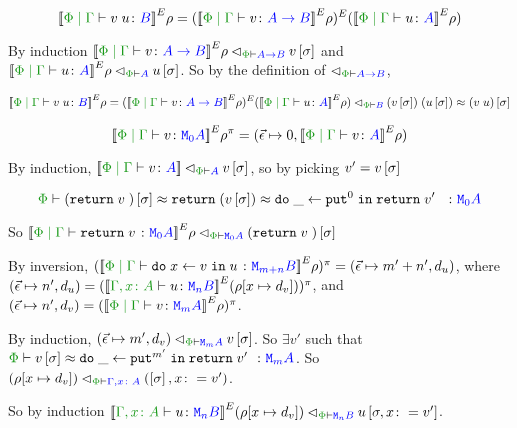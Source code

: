 \documentclass{Report}
\newcommand\eLogRel[4]{\logRel{#2}{\wellformed{#1}{#3}}{#4}}
\newcommand\peLogRel[3]{\eLogRel{\P}{#1}{#2}{#3}}
\newcommand{\zpberelation}[2]{\berelation{\P}{#1}{#2}}
\newcommand{\fapply}[0]{^E}
\newcommand\liftp[0]{^\pi}
\begin{document}
\begin{equation}
    \deno{\gpetyperelation{\apply{v}{u}}{B}}\fapply\rho = (\deno{\gpetyperelation{v}{\ab}}\fapply\rho)\fapply(\deno{\gpetyperelation{u}{A}}\fapply\rho)
\end{equation}

By induction $\peLogRel{\deno{\gpetyperelation{v}{\ab}}\fapply\rho}{\ab}{v\ssi}$ and $\peLogRel{\deno{\gpetyperelation{u}{A}}\fapply\rho}{A}{u\ssi}$. So by the definition of $\relates_{\wellformed{\P}{\ab}}$, 

\begin{align*}
    \deno{\gpetyperelation{\apply{v}{u}}{B}}\fapply\rho =\peLogRel{(\deno{\gpetyperelation{v}{\ab}}\fapply\rho)\fapply(\deno{\gpetyperelation{u}{A}}\fapply\rho)}{B}{\apply{(v\ssi)}{(u\ssi)}\beequiv (\apply{v}{u})\ssi}
\end{align*}


\begin{equation}
    \deno{\gpetyperelation{v}{\M{0}{A}}}\fapply\rho\liftp = (\ev\mapsto 0, \deno{\gpetyperelation{v}{A}}\fapply\rho)
\end{equation}

By induction, $\peLogRel{\deno{\gpetyperelation{v}{A}}}{A}{v\ssi}$, so by picking $v' = v\left[\sigma\right]$

\begin{equation}
    \zpberelation{(\return{v})\ssi}{\return{(v\ssi)\beequiv \doin{\_}{\put^0}{\return{v'}}}}{\M{0}{A}}
\end{equation}

So $\peLogRel{\deno{\gpetyperelation{\return{v}}{\M{0}{A}}}\fapply\rho}{\M{0}{A}}{(\return{v})\ssi}$


By inversion, $(\deno{\gpetyperelation{\doin{x}{v}{u}}{\M{m+n}{B}}}\fapply\rho)\liftp = (\ev\mapsto m'+n', d_u)$, where $(\ev\mapsto n', d_u) = (\deno{\typerelation{\gax}{u}{\mnb}}\fapply(\rho[x\mapsto d_v]))\liftp$, and $(\ev\mapsto n', d_v) = (\deno{\gpetyperelation{v}{\mma}}\fapply\rho)\liftp$.

By induction, $\peLogRel{(\ev\mapsto m', d_v)}{\mma}{v\ssi}$. So $\exists v'$ such that $\zpberelation{v\ssi}{\doin{\_}{\put^{m'}}{\return{v'}}}{\mma}$. So $\peLogRel{(\rho[x\mapsto d_v])}{\gax}{(\ssi, x\setto v')}$.

So by induction $\peLogRel{\deno{\typerelation{\gax}{u}{\mnb}}\fapply(\rho[x\mapsto d_v])}{\mnb}{u\sub{\si, x\setto v'}}$.
\end{document}
